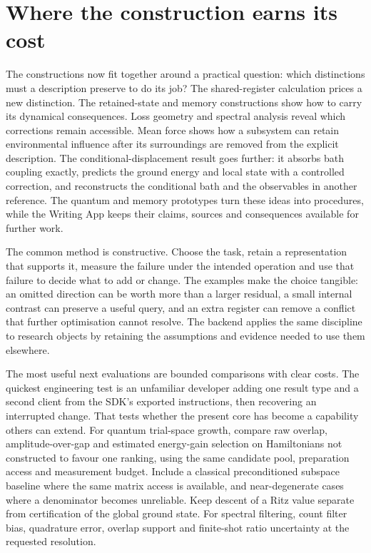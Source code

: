 \section{Where the construction earns its cost}
\label{section:the-collection-and-the-next-tests}

The constructions now fit together around a practical question: which distinctions must a description preserve to do its job? The shared-register calculation prices a new distinction. The retained-state and memory constructions show how to carry its dynamical consequences. Loss geometry and spectral analysis reveal which corrections remain accessible. Mean force shows how a subsystem can retain environmental influence after its surroundings are removed from the explicit description. The conditional-displacement result goes further: it absorbs bath coupling exactly, predicts the ground energy and local state with a controlled correction, and reconstructs the conditional bath and the observables in another reference. The quantum and memory prototypes turn these ideas into procedures, while the Writing App keeps their claims, sources and consequences available for further work.

The common method is constructive. Choose the task, retain a representation that supports it, measure the failure under the intended operation and use that failure to decide what to add or change. The examples make the choice tangible: an omitted direction can be worth more than a larger residual, a small internal contrast can preserve a useful query, and an extra register can remove a conflict that further optimisation cannot resolve. The backend applies the same discipline to research objects by retaining the assumptions and evidence needed to use them elsewhere.

The most useful next evaluations are bounded comparisons with clear costs. The quickest engineering test is an unfamiliar developer adding one result type and a second client from the SDK's exported instructions, then recovering an interrupted change. That tests whether the present core has become a capability others can extend. For quantum trial-space growth, compare raw overlap, amplitude-over-gap and estimated energy-gain selection on Hamiltonians not constructed to favour one ranking, using the same candidate pool, preparation access and measurement budget. Include a classical preconditioned subspace baseline where the same matrix access is available, and near-degenerate cases where a denominator becomes unreliable. Keep descent of a Ritz value separate from certification of the global ground state. For spectral filtering, count filter bias, quadrature error, overlap support and finite-shot ratio uncertainty at the requested resolution.

